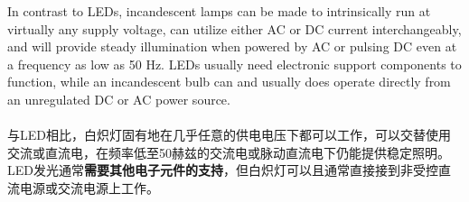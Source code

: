 \begin{slide}
  In contrast to LEDs, incandescent lamps can be made to intrinsically run at virtually any supply voltage, can utilize either AC or DC current interchangeably, and will provide steady illumination when powered by AC or pulsing DC even at a frequency as low as 50 Hz. LEDs usually need electronic support components to function, while an incandescent bulb can and usually does operate directly from an unregulated DC or AC power source.
  \\~\\
  与LED相比，白炽灯固有地在几乎任意的供电电压下都可以工作，可以交替使用交流或直流电，在频率低至50赫兹的交流电或脉动直流电下仍能提供稳定照明。LED发光通常\textbf{需要其他电子元件的支持}，但白炽灯可以且通常直接接到非受控直流电源或交流电源上工作。
\end{slide}
